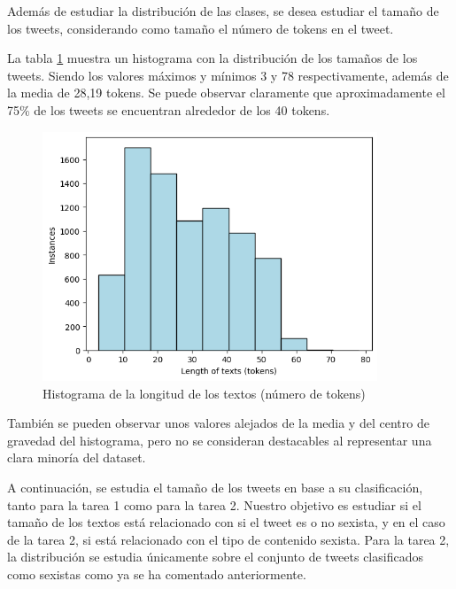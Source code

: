 Además de estudiar la distribución de las clases, se desea estudiar el tamaño de los tweets, considerando como tamaño el número de tokens en el tweet. 

La tabla \ref{tab:lengthtexts} muestra un histograma con la distribución de los tamaños de los tweets. Siendo los valores máximos y mínimos 3 y 78 respectivamente, además de la media de 28,19 tokens. Se puede observar claramente que aproximadamente el 75\% de los tweets se encuentran alrededor de los 40 tokens. 

\begin{figure}[H]
    \centering
    \includegraphics[width=10cm]{imagenes/Evaluacion/dataset_study/lenght_all_tokens.png}
    \caption{\centering Histograma de la longitud de los textos (número de tokens)}
    \label{tab:lengthtexts}
\end{figure}

También se pueden observar unos valores alejados de la media y del centro de gravedad del histograma, pero no se consideran destacables al representar una clara minoría del dataset.

A continuación, se estudia el tamaño de los tweets en base a su clasificación, tanto para la tarea 1 como para la tarea 2. Nuestro objetivo es estudiar si el tamaño de los textos está relacionado con si el tweet es o no sexista, y en el caso de la tarea 2, si está relacionado con el tipo de contenido sexista. Para la tarea 2, la distribución se estudia únicamente sobre el conjunto de tweets clasificados como sexistas como ya se ha comentado anteriormente. 


